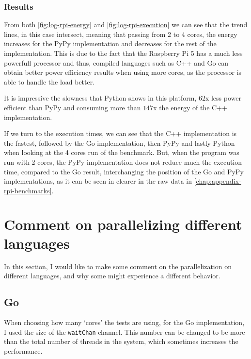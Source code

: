 \subsubsection{Results}







From both \autoref{fig:log-rpi-energy} and \autoref{fig:log-rpi-execution} we can see that the trend lines, in this case intersect, meaning that passing from 2 to 4 cores, the energy increases for the PyPy implementation and decreases for the rest of the implementation. This is due to the fact that the Raspberry Pi 5 has a much less powerfull processor and thus, compiled languages such as C++ and Go can obtain better power efficiency results when using more cores, as the processor is able to handle the load better. 

It is impressive the slowness that Python shows in this platform, $62$x less power efficient than PyPy and consuming more than $147$x the energy of the C++ implementation. 

If we turn to the execution times, we can see that the C++ implementation is the fastest, followed by the Go implementation, then PyPy and lastly Python when looking at the 4 cores run of the benchmark. But, when the program was run with 2 cores, the PyPy implementation does not reduce much the execution time, compared to the Go result, interchanging the position of the Go and PyPy implementations, as it can be seen in clearer in the raw data in \autoref{chap:appendix-rpi-benchmarks}.

\FloatBarrier
\section{Comment on parallelizing different languages}

In this section, I would like to make some comment on the parallelization on different languages, and why some might experience a different behavior. 

\subsection{Go}
When choosing how many `cores' the tests are using, for the Go implementation, I used the size of the \texttt{waitChan} channel. This number can be changed to be more than the total number of threads in the system, which sometimes increases the performance.

